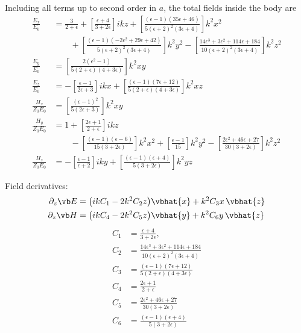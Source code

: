 \documentclass[letterpaper]{article}
\begin{document}
Including all terms up to second order in $a$, the total fields inside the 
body are
\begin{align*}
 \frac{E_x}{E_0} &= \frac{3}{2+\epsilon} 
        +\left[\frac{\epsilon+4}{3+2\epsilon}\right] ikz
  +\left[\frac{(\epsilon-1)(35\epsilon+46)}
              {5(\epsilon+2)^2 (3 \epsilon+4)}
   \right]k^2 x^2
\\[5pt]
&\qquad
  +\left[\frac{(\epsilon-1)(-2\epsilon^2+29\epsilon+42)}
              {5(\epsilon+2)^2 (3 \epsilon+4)}
   \right]k^2 y^2
  -\left[\frac{14\epsilon^3 + 3\epsilon^2 + 114\epsilon + 184}
              {10(\epsilon+2)^2 (3 \epsilon+4)}
   \right]k^2 z^2
\\[5pt]
 \frac{E_y}{E_0} 
 &= \left[\frac{2(\epsilon^2-1)}{5(2+\epsilon)(4+3\epsilon)}\right] k^2 xy
\\
 \frac{E_z}{E_0} &= -\left[\frac{\epsilon-1}{2\epsilon+3}\right] ikx
        +\left[\frac{(\epsilon-1)(7\epsilon+12)}
                    {5(2+\epsilon)(4+3\epsilon)}
        \right]k^2 xz
\\[5pt]
 \frac{H_x}{Z_0 E_0} 
 &= \left[\frac{(\epsilon-1)^2}{5(2\epsilon+3)}\right] k^2 xy
\\[5pt]
 \frac{H_y}{Z_0 E_0} 
  &= 1 + \left[\frac{2\epsilon+1}{2+\epsilon}\right] ikz
\\[5pt]
&\qquad - \left[\frac{(\epsilon-1)(\epsilon-6)}{15(3+2\epsilon)}\right]k^2 x^2
        + \left[\frac{\epsilon-1}{15}\right]k^2 y^2 
        - \left[\frac{2\epsilon^2 + 46\epsilon + 27}{30(3+2\epsilon)}
          \right]k^2 z^2
\\
 \frac{H_z}{Z_0 E_0} 
     &= -\left[\frac{\epsilon-1}{\epsilon+2}\right] iky
        +\left[\frac{(\epsilon-1)(\epsilon+4)}
                    {5(3+2\epsilon)}\right] k^2 yz
\end{align*}

Field derivatives:
\begin{align*}
 \partial_z \vb E &= \big(ikC_1 - 2k^2 C_2 z\big)\vbhat{x} 
                     +k^2 C_3 x\,\vbhat{z}
\\
 \partial_z \vb H &= \big(ik C_4 - 2k^2 C_5 z\big) \vbhat{y}
                     +k^2 C_6 y\,\vbhat{z}
\end{align*}
\begin{align*}
 C_1 &= \frac{\epsilon+4}{3+2\epsilon},
\\
 C_2 &= \frac{14\epsilon^3 + 3\epsilon^2 + 114\epsilon + 184}
             {10(\epsilon+2)^2 (3 \epsilon+4)}
\\
 C_3 &= \frac{(\epsilon-1)(7\epsilon+12)}{5(2+\epsilon)(4+3\epsilon)}
\\
C_4 &= \frac{2\epsilon+1}{2+\epsilon}
\\
C_5 &= \frac{2\epsilon^2 + 46\epsilon + 27}{30(3+2\epsilon)}
\\
C_6 &= \frac{(\epsilon-1)(\epsilon+4)} {5(3+2\epsilon)}
\end{align*}
\end{document}
